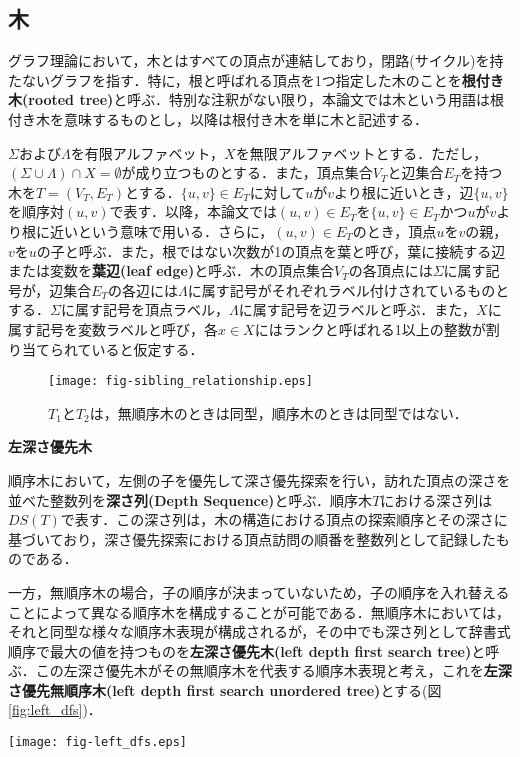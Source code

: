 \subsection{木}
グラフ理論において，木とはすべての頂点が連結しており，閉路(サイクル)を持たないグラフを指す．特に，根と呼ばれる頂点を1つ指定した木のことを\textbf{根付き木(rooted tree)}と呼ぶ．特別な注釈がない限り，本論文では木という用語は根付き木を意味するものとし，以降は根付き木を単に木と記述する．

$\Sigma$および$\Lambda$を有限アルファベット，$X$を無限アルファベットとする．ただし，$(\Sigma\cup\Lambda)\cap X=\emptyset$が成り立つものとする．また，頂点集合$V_T$と辺集合$E_T$を持つ木を$T = (V_T, E_T)$とする．$\{u,v\}\in E_T$に対して$u$が$v$より根に近いとき，辺$\{u,v\}$を順序対$(u,v)$で表す．以降，本論文では$(u,v)\in E_T$を$\{u,v\}\in E_T$かつ$u$が$v$より根に近いという意味で用いる．さらに，$(u,v)\in E_T$のとき，頂点$u$を$v$の親，$v$を$u$の子と呼ぶ．また，根ではない次数が1の頂点を葉と呼び，葉に接続する辺または変数を\textbf{葉辺(leaf edge)}と呼ぶ．木の頂点集合$V_T$の各頂点には$\Sigma$に属す記号が，辺集合$E_T$の各辺には$\Lambda$に属す記号がそれぞれラベル付けされているものとする．$\Sigma$に属す記号を頂点ラベル，$\Lambda$に属す記号を辺ラベルと呼ぶ．また，$X$に属す記号を変数ラベルと呼び，各$x \in X$にはランクと呼ばれる1以上の整数が割り当てられていると仮定する．

\begin{figure}[tb]
  \centering
  \texttt{[image: fig-sibling\_relationship.eps]}
  \caption{$T_1$と$T_2$は，無順序木のときは同型，順序木のときは同型ではない．}\label{fig:sibling_relationship}
\end{figure}



\begin{define}{\bf 左深さ優先木}\par
  順序木において，左側の子を優先して深さ優先探索を行い，訪れた頂点の深さを並べた整数列を\textbf{深さ列(Depth Sequence)}と呼ぶ．順序木$T$における深さ列は$DS(T)$で表す．この深さ列は，木の構造における頂点の探索順序とその深さに基づいており，深さ優先探索における頂点訪問の順番を整数列として記録したものである．

  一方，無順序木の場合，子の順序が決まっていないため，子の順序を入れ替えることによって異なる順序木を構成することが可能である．無順序木においては，それと同型な様々な順序木表現が構成されるが，その中でも深さ列として辞書式順序で最大の値を持つものを\textbf{左深さ優先木(left depth first search tree)}と呼ぶ．この左深さ優先木がその無順序木を代表する順序木表現と考え，これを\textbf{左深さ優先無順序木(left depth first search unordered tree)}とする(図\ref{fig:left_dfs})．%
\end{define}

\begin{figure*}[tb]
  \centering
  \texttt{[image: fig-left\_dfs.eps]}
  \caption{$T_1,T_2,T_3$は同型の無順序木で，左深さ優先木を定めると$T_1$に一意に定まる．}\label{fig:left_dfs}
\end{figure*}

%


